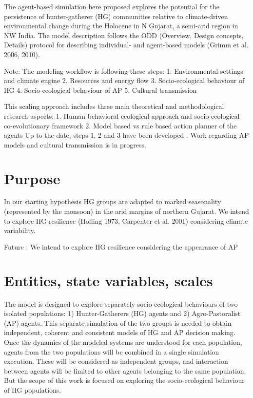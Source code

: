 \documentclass[11pt,oneside,a4paper,openright]{report}
\begin{document}
The agent-based simulation here proposed explores the potential for the persistence of hunter-gatherer
(HG) communities relative to climate-driven environmental change during the Holocene in N Gujarat, a
semi-arid region in NW India.
The model description follows the ODD (Overview, Design concepts, Details) protocol for describing
individual- and agent-based models (Grimm et al. 2006, 2010).


Note:
The modeling workflow is following these steps:
1. Environmental settings and climate engine
2. Resources and energy flow
3. Socio-ecological behaviour of HG
4. Socio-ecological behaviour of AP
5. Cultural transmission

This scaling approach includes three main theoretical and methodological research aspects:
1. Human behavioral ecological approach and socio-ecological co-evolutionary framework
2. Model based vs rule based action planner of the agents
Up to the date, steps 1, 2 and 3 have been developed . Work regarding AP models and cultural
transmission is in progress.



\section{Purpose}
In our starting hypothesis HG groups are adapted to marked seasonality (represented by the
monsoon) in the arid margins of northern Gujarat. We intend to explore HG resilience (Holling 1973,
Carpenter et al. 2001) considering climate variability.

Future : We intend to explore HG resilience considering the appearance of AP

\section{Entities, state variables, scales}


The model is designed to explore separately socio-ecological behaviours of two isolated populations: 1)
Hunter-Gatherers (HG) agents and 2) Agro-Pastoralist (AP) agents. This separate simulation of the
two groups is needed to obtain independent, coherent and consistent models of HG and AP decision
making. Once the dynamics of the modeled systems are understood for each population, agents from
the two populations will be combined in a single simulation execution. These will be considered as
independent groups, and interaction between agents will be limited to other agents belonging to the
same population. But the scope of this work is focused on exploring the socio-ecological behaviour of HG populations.
\end{document}
